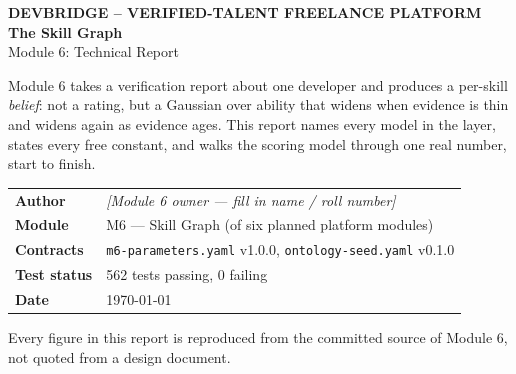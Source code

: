 \documentclass[11pt,a4paper]{article}
\begin{document}
\begin{titlepage}
\centering
\vspace*{2.2cm}
{\sffamily\footnotesize\bfseries\color{mutedgray}\MakeUppercase{DevBridge --
Verified-Talent Freelance Platform}}\\[1.6cm]

{\sffamily\Huge\bfseries\color{accent} The Skill Graph}\\[0.5cm]
{\sffamily\Large\color{inkgray} Module 6: Technical Report}\\[2.2cm]

\vspace{1.4cm}

{\sffamily\normalsize\color{inkgray}
Module 6 takes a verification report about one developer and produces a
per-skill \emph{belief}: not a rating, but a Gaussian over ability that widens
when evidence is thin and widens again as evidence ages. This report names
every model in the layer, states every free constant, and walks the scoring
model through one real number, start to finish.}

\vspace{2.6cm}

\begin{tabular}{ll}
\sffamily\bfseries\color{mutedgray} Author        & \emph{[Module 6 owner --- fill in name / roll number]} \\[4pt]
\sffamily\bfseries\color{mutedgray} Module         & M6 --- Skill Graph (of six planned platform modules) \\[4pt]
\sffamily\bfseries\color{mutedgray} Contracts      & \texttt{m6-parameters.yaml} v1.0.0, \texttt{ontology-seed.yaml} v0.1.0 \\[4pt]
\sffamily\bfseries\color{mutedgray} Test status    & 562 tests passing, 0 failing \\[4pt]
\sffamily\bfseries\color{mutedgray} Date           & \today \\
\end{tabular}

\vfill
{\small\color{mutedgray}\sffamily Every figure in this report is reproduced
from the committed source of Module 6, not quoted from a design document.}
\end{titlepage}

\tableofcontents
\thispagestyle{empty}
\newpage
\end{document}
